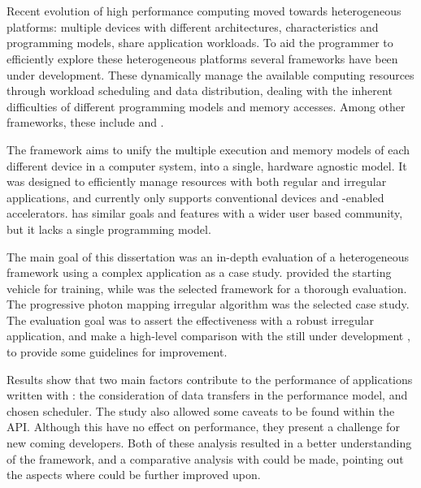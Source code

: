 \documentclass[main.tex]{subfiles}
\begin{document}
\cleardoublepage
{}
{}
\chapter*{\abstractname}

Recent evolution of high performance computing moved towards heterogeneous platforms: multiple devices with different architectures, characteristics and programming models, share application workloads. To aid the programmer to efficiently explore these heterogeneous platforms several frameworks have been under development. These dynamically manage the available computing resources through workload scheduling and data distribution, dealing with the inherent difficulties of different programming models and memory accesses. Among other frameworks, these include \gama and \starpu.

The \gama framework aims to unify the multiple execution and memory models of each different device in a computer system, into a single, hardware agnostic model. It was designed to efficiently manage resources with both regular and irregular applications, and currently only supports conventional \cpu devices and \cuda-enabled accelerators. \starpu has similar goals and features with a wider user based community, but it lacks a single programming model.

The main goal of this dissertation was an in-depth evaluation of a heterogeneous framework using a complex application as a case study. \gama provided the starting vehicle for training, while \starpu was the selected framework for a thorough evaluation. The progressive photon mapping irregular algorithm was the selected case study. The evaluation goal was to assert the \starpu effectiveness with a robust irregular application, and make a high-level comparison with the still under development \gama, to provide some guidelines for \gama improvement.

Results show that two main factors contribute to the performance of applications written with \starpu: the consideration of data transfers in the performance model, and chosen scheduler. The study also allowed some caveats to be found within the \starpu API. Although this have no effect on performance, they present a challenge for new coming developers. Both of these analysis resulted in a better understanding of the framework, and a comparative analysis with \gama could be made, pointing out the aspects where \gama could be further improved upon.
\end{document}
